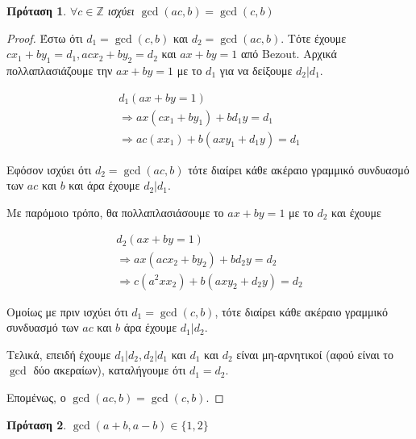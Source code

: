 \documentclass[oneside]{article}
\newtheorem*{lemma}{Πρόταση}
\begin{document}
\begin{lemma}
    $\forall c \in \mathbb{Z}$ ισχύει $\gcd(ac, b) = \gcd(c, b)$
\end{lemma}

\begin{proof}
    Έστω ότι  $d_1 = \gcd(c,b)$ και $d_2 = \gcd(ac,b)$.
    Τότε έχουμε $cx_1 + by_1 = d_1, acx_2 + by_2 = d_2$ και $ax + by = 1$ από Bezout.
    Αρχικά πολλαπλασιάζουμε την $ax+by = 1$ με το $d_1$ για να δείξουμε $d_2 | d_1$.
    
    \begin{equation}
        \begin{split}
            d_1(ax + by = 1)  \\
            \Rightarrow ax(cx_1 + by_1) + bd_1y = d_1  \\
            \Rightarrow ac(xx_1) + b(axy_1 + d_1y)  = d_1 
        \end{split}
    \end{equation}
    
    Εφόσον ισχύει ότι $d_2 = \gcd(ac, b)$ τότε διαίρει κάθε ακέραιο γραμμικό συνδυασμό των $ac$ και $b$ και άρα έχουμε $d_2|d_1$. 

    Με παρόμοιο τρόπο, θα πολλαπλασιάσουμε το $ax + by = 1$ με το $d_2$ και έχουμε

    \begin{equation}
        \begin{split}
            d_2(ax + by = 1) \\
            \Rightarrow ax(acx_2 + by_2) + bd_2y = d_2 \\
            \Rightarrow c(a^2xx_2) + b(axy_2 + d_2y) = d_2
        \end{split}
    \end{equation}

    Ομοίως με πριν ισχύει ότι $d_1 = \gcd(c,b)$, τότε διαίρει κάθε ακέραιο γραμμικό συνδυασμό των $ac$ και $b$ άρα έχουμε $d_1|d_2$.

    Τελικά, επειδή έχουμε $d_1|d_2, d_2|d_1$ και $d_1$ και $d_2$ είναι μη-αρνητικοί (αφού είναι το $\gcd$ δύο ακεραίων), καταλήγουμε ότι $d_1 = d_2$.
    
    Επομένως, ο $\gcd(ac,b) = \gcd(c,b)$.
\end{proof}

\begin{lemma}
    $\gcd(a+b, a-b) \in \{1,2\}$
\end{lemma}
\end{document}
